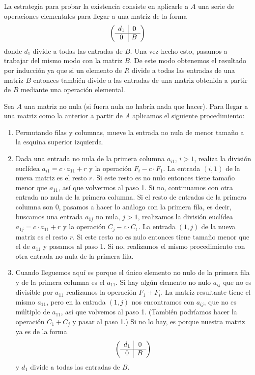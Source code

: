 
La estrategia para probar la existencia consiste en aplicarle a \(A\)
una serie de operaciones elementales para llegar a una matriz de la
forma \[\left(\begin{array}{c|c}
d_1&0\cr \hline 0&B
\end{array}\right)\] donde \(d_1\) divide a todas las entradas de \(B\).
Una vez hecho esto, pasamos a trabajar del mismo modo con la matriz
\(B\). De este modo obtenemos el resultado por inducción ya que si un
elemento de \(R\) divide a todas las entradas de una matriz \(B\)
entonces también divide a las entradas de una matriz obtenida a partir
de \(B\) mediante una operación elemental.

Sea \(A\) una matriz no nula (si fuera nula no habría nada que hacer).
Para llegar a una matriz como la anterior a partir de \(A\) aplicamos el
siguiente procedimiento:

\begin{enumerate}
\def\labelenumi{\arabic{enumi}.}
\item
  Permutando filas y columnas, mueve la entrada no nula de menor tamaño
  a la esquina superior izquierda.
\item
  Dada una entrada no nula de la primera columna \(a_{i1}\), \(i>1\),
  realiza la división euclídea \(a_{i1}=c\cdot a_{11}+r\) y la
  operación \(F_{i}-c\cdot F_1\). La entrada \((i,1)\) de la nueva
  matriz es el resto \(r\). Si este resto es no nulo entonces tiene
  tamaño menor que \(a_{11}\), así que volvermos al paso 1. Si no,
  continuamos con otra entrada no nula de la primera columna. Si el
  resto de entradas de la primera columna son \(0\), pasamos a hacer lo
  análogo con la primera fila, es decir, buscamos una entrada
  \(a_{1j}\) no nula, \(j>1\), realizamos la división euclídea
  \(a_{1j}=c\cdot a_{11}+r\) y la operación \(C_{j}-c\cdot C_1\). La
  entrada \((1,j)\) de la nueva matriz es el resto \(r\). Si este resto
  no es nulo entonces tiene tamaño menor que el de \(a_{11}\) y pasamos
  al paso 1. Si no, realizamos el mismo procedimiento con otra entrada
  no nula de la primera fila.
\item
  Cuando lleguemos aquí es porque el único elemento no nulo de la
  primera fila y de la primera columna es el \(a_{11}\). Si hay algún
  elemento no nulo \(a_{ij}\) que no es divisible por \(a_{11}\)
  realizamos la operación \(F_{1}+F_{i}\). La matriz resultante tiene
  el mismo \(a_{11}\), pero en la entrada \((1,j)\) nos encontramos con
  \(a_{ij}\), que no es múltiplo de \(a_{11}\), así que volvemos al
  paso 1. (También podríamos hacer la operación \(C_{1}+C_{j}\) y
  pasar al paso 1.) Si no lo hay, es porque nuestra matriz ya es de la
  forma \[\left(\begin{array}{c|c}
  d_1&0\cr \hline 0&B
  \end{array}\right)\] y \(d_1\) divide a todas las entradas de \(B\).
\end{enumerate}


